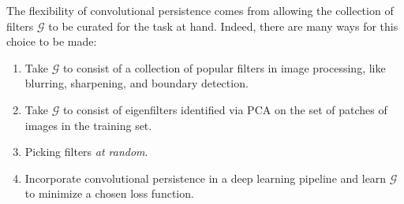 \documentclass[conference]{IEEEtran}
\theoremstyle{definition}
\numberwithin{figure}{section}
\begin{document}
%



The flexibility of convolutional persistence comes from allowing the collection of filters $\mathcal{G}$ to be curated for the task at hand. Indeed, there are many ways for this choice to be made:
\begin{enumerate}
	\item Take $\mathcal{G}$ to consist of a collection of popular filters in image processing, like blurring, sharpening, and boundary detection.
	\item Take $\mathcal{G}$ to consist of eigenfilters identified via PCA on the set of patches of images in the training set.
	\item Picking filters \emph{at random}.
	\item Incorporate convolutional persistence in a deep learning pipeline and learn $\mathcal{G}$ to minimize a chosen loss function.
\end{enumerate}
\end{document}
